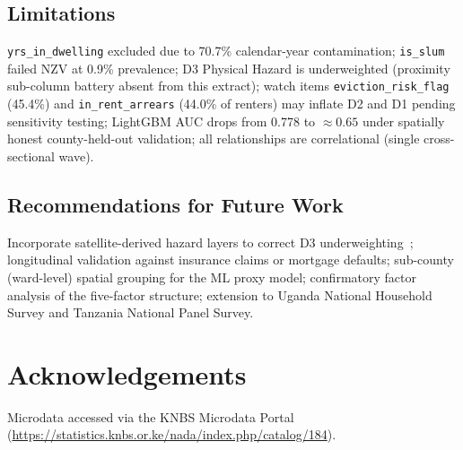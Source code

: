 \documentclass[3p,twocolumn,10pt]{elsarticle}
\begin{document}
\subsection*{Limitations}

\texttt{yrs\_in\_dwelling} excluded due to 70.7\% calendar-year contamination;
\texttt{is\_slum} failed NZV at 0.9\% prevalence; D3 Physical Hazard is underweighted
(proximity sub-column battery absent from this extract); watch items
\texttt{eviction\_risk\_flag} (45.4\%) and \texttt{in\_rent\_arrears} (44.0\% of renters)
may inflate D2 and D1 pending sensitivity testing; LightGBM AUC drops from 0.778 to
$\approx0.65$ under spatially honest county-held-out validation; all relationships are
correlational (single cross-sectional wave).

\subsection*{Recommendations for Future Work}

Incorporate satellite-derived hazard layers to correct D3 underweighting~\cite{mugiraneza2022rwanda};
longitudinal validation against insurance claims or mortgage defaults; sub-county
(ward-level) spatial grouping for the ML proxy model; confirmatory factor analysis of the
five-factor structure; extension to Uganda National Household Survey and Tanzania National
Panel Survey.

\section*{Acknowledgements}
Microdata accessed via the KNBS Microdata Portal
(\url{https://statistics.knbs.or.ke/nada/index.php/catalog/184}).



\end{document}
